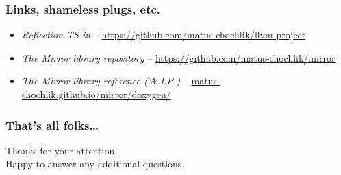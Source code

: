 \documentclass[compress,table,xcolor=table]{beamer}
\begin{document}
\begin{frame}
  \frametitle{Links, shameless plugs, etc.}
  \begin{itemize}
    \item {\em Reflection TS in } --
      \url{https://github.com/matus-chochlik/llvm-project}
    \item {\em The Mirror library repository} --
      \url{https://github.com/matus-chochlik/mirror}
    \item {\em The Mirror library reference (W.I.P.)} --
      \url{matus-chochlik.github.io/mirror/doxygen/}
  \end{itemize}
\end{frame}
\begin{frame}
  \frametitle{That's all folks\dots}
  \centering
  \Huge
  Thanks for your attention.\\
  \Large
  Happy to answer any additional questions.
\end{frame}
\end{document}
